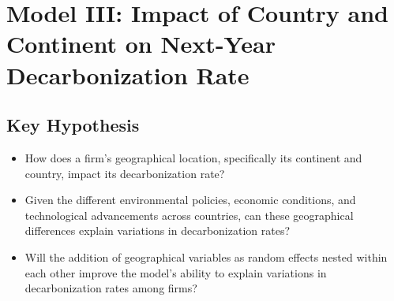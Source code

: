 
\section{Model III: Impact of Country and Continent on Next-Year Decarbonization Rate}

\subsection{Key Hypothesis}
\begin{itemize}
    \item How does a firm's geographical location, specifically its continent and country, impact its decarbonization rate?
    \item Given the different environmental policies, economic conditions, and technological advancements across countries, can these geographical differences explain variations in decarbonization rates?
    \item Will the addition of geographical variables as random effects nested within each other improve the model's ability to explain variations in decarbonization rates among firms?
\end{itemize}

